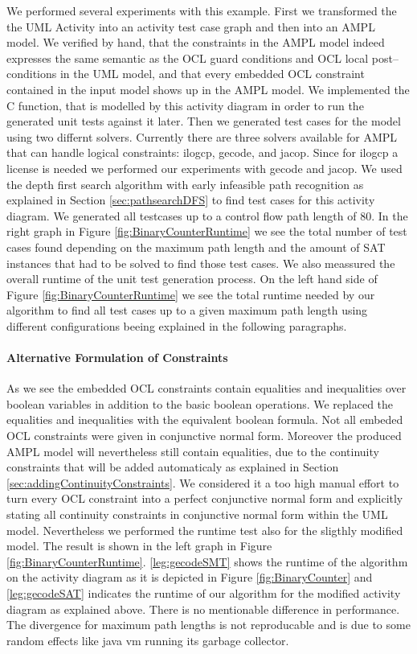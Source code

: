 We performed several experiments with this example. First we transformed the the UML Activity into an activity test case graph and then into an AMPL model. We verified by hand, that the constraints in the AMPL model indeed expresses the same semantic as the OCL guard conditions and OCL local post--conditions in the UML model, and that every embedded OCL constraint contained in the input model shows up in the AMPL model. We implemented the C function, that is modelled by this activity diagram in order to run the generated unit tests against it later. Then we generated test cases for the model using two differnt solvers. Currently there are three solvers available for AMPL that can handle logical constraints: ilogcp, gecode, and jacop. Since for ilogcp a license is needed we performed our experiments with gecode and jacop. We used the depth first search algorithm with early infeasible path recognition as explained in Section \ref{sec:pathsearchDFS} to find test cases for this activity diagram. We generated all testcases up to a control flow path length of 80. In the right graph in Figure \ref{fig:BinaryCounterRuntime} we see the total number of test cases found depending on the maximum path length and the amount of SAT instances that had to be solved to find those test cases. We also meassured the overall runtime of the unit test generation process. On the left hand side of Figure \ref{fig:BinaryCounterRuntime} we see the total runtime needed by our algorithm to find all test cases up to a given maximum path length using different configurations beeing explained in the following paragraphs.
\paragraph{Alternative Formulation of Constraints}
As we see the embedded OCL constraints contain equalities and inequalities over boolean variables in addition to the basic boolean operations. We replaced the equalities and inequalities with the equivalent boolean formula. Not all embeded OCL constraints were given in conjunctive normal form. Moreover the produced AMPL model will nevertheless still contain equalities, due to the continuity constraints that will be added automaticaly as explained in Section \ref{sec:addingContinuityConstraints}. We considered it a too high manual effort to turn every OCL constraint into a perfect conjunctive normal form and explicitly stating all continuity constraints in conjunctive normal form within the UML model. Nevertheless we performed the runtime test also for the sligthly modified model. The result is shown in the left graph in Figure \ref{fig:BinaryCounterRuntime}. \ref{leg:gecodeSMT} shows the runtime of the algorithm on the activity diagram as it is depicted in Figure \ref{fig:BinaryCounter} and \ref{leg:gecodeSAT} indicates the runtime of our algorithm for the modified activity diagram as explained above. There is no mentionable difference in performance. The divergence for maximum path lengths is not reproducable and is due to some random effects like java vm running its garbage collector.
